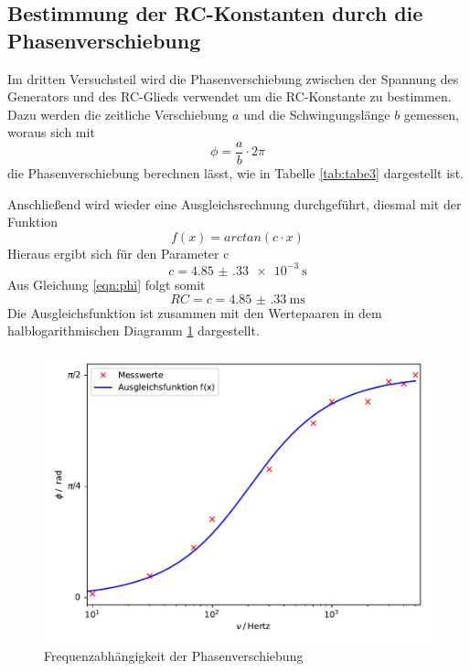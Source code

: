 \subsection{Bestimmung der RC-Konstanten durch die Phasenverschiebung}
Im dritten Versuchsteil wird die Phasenverschiebung zwischen der Spannung
des Generators und des RC-Glieds verwendet um die RC-Konstante zu bestimmen. Dazu
werden die zeitliche Verschiebung $a$ und die Schwingungslänge $b$ gemessen,
woraus sich mit
\begin{equation}
  \phi = \frac{a}{b} \cdot 2\pi
\end{equation}
die Phasenverschiebung berechnen lässt, wie in Tabelle \ref{tab:tabe3}
dargestellt ist.

Anschließend wird wieder eine Ausgleichsrechnung durchgeführt, diesmal mit der
Funktion
\begin{equation}
  f(x) = arctan (c \cdot x)
\end{equation}
Hieraus ergibt sich für den Parameter c
\begin{equation*}
  c = \SI{4.85(33)e-3}{\second}
\end{equation*}
Aus Gleichung \ref{eqn:phi} folgt somit
\begin{equation}
   RC = c = \SI{4.85(33)}{\milli\second}
\end{equation}
Die Ausgleichsfunktion ist zusammen mit den Wertepaaren in dem halblogarithmischen
Diagramm \ref{fig:phase} dargestellt.
\begin{figure}[H]
  \centering
  \includegraphics{plot3.pdf}
  \caption{Frequenzabhängigkeit der Phasenverschiebung}
  \label{fig:phase}
\end{figure}

